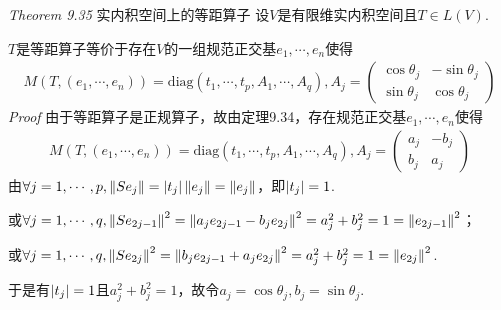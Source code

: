 \hspace*{\fill}

\textit{Theorem 9.35} {\kaishu 实内积空间上的等距算子}
设\(V\)是有限维实内积空间且\(T \in L(V)\).

\(T\)是等距算子等价于存在\(V\)的一组规范正交基\(e_1,\cdots,e_n\)使得
    \begin{align*}
        M(T,(e_1,\cdots,e_n))=\mathrm{diag}(t_1,\cdots,t_p,A_1,\cdots,A_q),A_j=
        \begin{pmatrix}
            \cos \theta_j & -\sin \theta_j \\
            \sin \theta_j & \cos \theta_j
        \end{pmatrix}
    \end{align*}
\textit{Proof}
由于等距算子是正规算子，故由定理9.34，存在规范正交基\(e_1,\cdots,e_n\)使得
    \begin{align*}
        M(T,(e_1,\cdots,e_n))=\mathrm{diag}(t_1,\cdots,t_p,A_1,\cdots,A_q),A_j=
        \begin{pmatrix}
            a_j & -b_j \\
            b_j & a_j
        \end{pmatrix}
    \end{align*}
由\(\forall j=1,\cdots,p,\left\lVert Se_j \right\rVert=\left\lvert t_j \right\rvert\left\lVert e_j \right\rVert=\left\lVert e_j \right\rVert\)，即\(\left\lvert t_j \right\rvert=1\).

或\(\forall j=1,\cdots,q,\left\lVert Se_{2j-1} \right\rVert^2=\left\lVert a_je_{2j-1}-b_je_{2j} \right\rVert^2=a_j^2+b_j^2=1=\left\lVert e_{2j-1} \right\rVert^2\)；

或\(\forall j=1,\cdots,q,\left\lVert Se_{2j} \right\rVert^2=\left\lVert b_je_{2j-1}+a_je_{2j} \right\rVert^2=a_j^2+b_j^2=1=\left\lVert e_{2j} \right\rVert^2\).

于是有\(\left\lvert t_j \right\rvert=1\)且\(a_j^2+b_j^2=1\)，故令\(a_j=\cos \theta_j,b_j=\sin \theta_j\).

